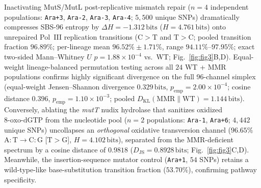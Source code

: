 \documentclass[10pt,letterpaper]{article}
\theoremstyle{plain}
\theoremstyle{definition}
\begin{document}
Inactivating MutS/MutL post-replicative mismatch repair ($n = 4$ independent populations: \texttt{Ara+3}, \texttt{Ara-2}, \texttt{Ara-3}, \texttt{Ara-4}; $5{,}500$ unique SNPs) dramatically compresses SBS-96 entropy by $\Delta H = -1.312\,\mathrm{bits}$ ($H = 4.761\,\mathrm{bits}$) onto unrepaired Pol~III replication transitions ($\mathrm{C{>}T}$ and $\mathrm{T{>}C}$; pooled transition fraction $96.89\%$; per-lineage mean $96.52\% \pm 1.71\%$, range $94.11\%$--$97.95\%$; exact two-sided Mann--Whitney $U$ $p = 1.88 \times 10^{-4}$ vs.\ WT; Fig.~\ref{fig:fig3}B,D). Equal-weight lineage-balanced permutation testing across all $24$ WT + MMR populations confirms highly significant divergence on the full 96-channel simplex (equal-weight Jensen--Shannon divergence $0.329\,\mathrm{bits}$, $p_{\mathrm{emp}} = 2.00 \times 10^{-4}$; cosine distance $0.396$, $p_{\mathrm{emp}} = 1.10 \times 10^{-3}$; pooled $D_{\mathrm{KL}}(\mathrm{MMR}\parallel\mathrm{WT}) = 1.144\,\mathrm{bits}$). Conversely, ablating the \emph{mutT} nudix hydrolase that sanitizes oxidized $\text{8-oxo-dGTP}$ from the nucleotide pool ($n = 2$ populations: \texttt{Ara-1}, \texttt{Ara+6}; $4{,}442$ unique SNPs) uncollapses an \emph{orthogonal} oxidative transversion channel ($96.65\%$ $\mathrm{A{:}T \to C{:}G}$ [$\mathrm{T{>}G}$], $H = 4.102\,\mathrm{bits}$), separated from the MMR-deficient spectrum by a cosine distance of \textbf{$0.9818$} ($D_{\text{JS}} = 0.8928\,\mathrm{bits}$; Fig.~\ref{fig:fig3}C,D). Meanwhile, the insertion-sequence mutator control (\texttt{Ara+1}, $54$ SNPs) retains a wild-type-like base-substitution transition fraction ($53.70\%$), confirming pathway specificity.
\end{document}
